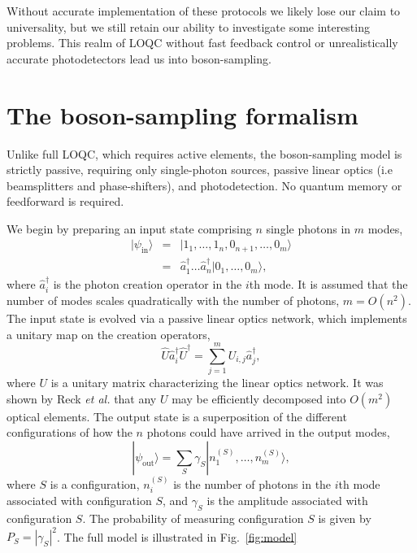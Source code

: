 \documentclass[aps,pra,twocolumn,amsmath,amssymb,nofootinbib,superscriptaddress]{revtex4}
\newcommand{\ket}[1]{|#1\rangle}
\begin{document}
Without accurate implementation of these protocols we likely lose our claim to universality, but we still retain our ability to investigate some interesting problems. This realm of LOQC without fast feedback control or unrealistically accurate photodetectors lead us into boson-sampling.

\section{The boson-sampling formalism}

Unlike full LOQC, which requires active elements, the boson-sampling model is strictly passive, requiring only single-photon sources, passive linear optics (i.e beamsplitters and phase-shifters), and photodetection. No quantum memory or feedforward is required.

We begin by preparing an input state comprising $n$ single photons in $m$ modes,
\begin{eqnarray} \label{eq:input_state}
\ket{\psi_\mathrm{in}} &=& \ket{1_1,\dots,1_n,0_{n+1},\dots,0_m} \nonumber \\
&=& \hat{a}^\dag_1 \dots \hat{a}^\dag_n \ket{0_1,\dots,0_m},
\end{eqnarray}
where $\hat{a}^\dag_i$ is the photon creation operator in the $i$th mode. It is assumed that the number of modes scales quadratically with the number of photons, \mbox{$m=O(n^2)$}. The input state is evolved via a passive linear optics network, which implements a unitary map on the creation operators,
\begin{equation} \label{eq:Utransform}
\hat{U}\hat{a}_i^\dag\hat{U}^\dag = \sum_{j=1}^m U_{i,j} \hat{a}_j^\dag,
\end{equation} 
where $U$ is a unitary matrix characterizing the linear optics network. It was shown by Reck \emph{et al.} \cite{bib:Reck94} that any $U$ may be efficiently decomposed into $O(m^2)$ optical elements. The output state is a superposition of the different configurations of how the $n$ photons could have arrived in the output modes,
\begin{equation}
\ket{\psi_\mathrm{out}} = \sum_S \gamma_S \ket{n_1^{(S)},\dots,n_m^{(S)}},
\end{equation}
where $S$ is a configuration, $n_i^{(S)}$ is the number of photons in the $i$th mode associated with configuration $S$, and $\gamma_S$ is the amplitude associated with configuration $S$. The probability of measuring configuration $S$ is given by \mbox{$P_S = |\gamma_S|^2$}. The full model is illustrated in Fig.~\ref{fig:model}
\end{document}

